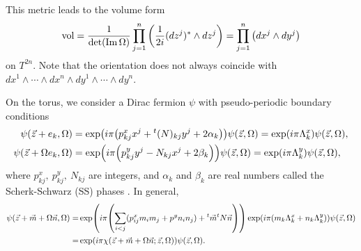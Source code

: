 \documentclass[11pt]{article}
\begin{document}
This metric leads to the volume form 
\begin{align}
    \text{vol}= \frac{1}{\det(\Im \Omega)} \prod_{j=1}^n \qty(\frac{1}{2i} (dz^j)^\ast \wedge d{z}^{j})=  \prod_{j=1}^n \qty(  dx^j \wedge d{y}^j)
\end{align}
on $T^{2n}$. 
Note that the orientation does not always coincide with $dx^1 \wedge \cdots \wedge dx^n \wedge dy^1 \wedge \cdots \wedge dy^n  $.




On the torus, we consider a Dirac fermion $\psi$ with pseudo-periodic boundary conditions
\begin{align}
\psi( \vec{z}+e_k,\Omega )&= \exp( i\pi \qty(  p^x_{kj}x^j + {}^t(N)_{kj}y^j +2 \alpha_k ))\psi(\vec{z},\Omega )=\exp(i\pi \Lambda_k^x )\psi(\vec{z},\Omega ), \label{eq:pseudo-PBC1}\\
    \psi(\vec{z}+\Omega e_k,\Omega )&= \exp( i\pi \qty(  p^y_{kj}y^j -N_{kj}x^j +2 \beta_k ))\psi(\vec{z},\Omega )=\exp(i\pi \Lambda_k^y )\psi(\vec{z},\Omega )\label{eq:pseudo-PBC2},
\end{align}
where $p^x_{kj},~p^y_{kj},~N_{kj}$ are integers, and $\alpha_k$ and $\beta_k$ are real numbers called the Scherk-Schwarz
(SS) phases \cite{Scherk:1978ta}. In general,
\begin{align}
    \psi(\vec{z}+\vec{m}+\Omega \vec{n},\Omega)=&\exp(i\pi \qty(\sum_{i<j} (p^x_{ij} m_i m_j +p^y n_i n_j)+{}^t\vec{m} {}^t N \vec{n} ))\exp(i\pi (m_k \Lambda_k^x +n_k \Lambda_k^y ))\psi(\vec{z},\Omega  ) \nonumber \\
    =&\exp(i\pi\chi( \vec{z}+\vec{m}+\Omega \vec{n};\vec{z},\Omega))\psi(\vec{z},\Omega ).
\end{align}
\end{document}
